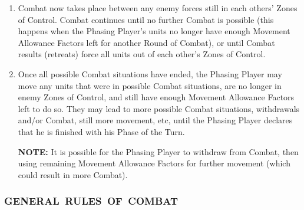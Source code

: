 \begin{enumerate}
  The Non-Phasing Player must make this decision for each of his units or Stacks of units that lies in an Enemy Zone of Control.

  \item Combat now takes place between any enemy forces still in each others' Zones of Control. Combat continues until no further Combat is possible (this happens when the Phasing Player's units no longer have enough Movement Allowance Factors left for another Round of Combat), or until Combat results (retreats) force all units out of each other's Zones of Control.

  \item Once all possible Combat situations have ended, the Phasing Player may move any units that were in possible Combat situations, are no longer in enemy Zones of Control, and still have enough Movement Allowance Factors left to do so. They may lead to more possible Combat situations, withdrawals and/or Combat, still more movement, etc, until the Phasing Player declares that he is finished with his Phase of the Turn.

  \textbf{NOTE:} It is possible for the Phasing Player to withdraw from Combat, then using remaining Movement Allowance Factors for further movement (which could result in more Combat).
\end{enumerate}

\subsubsection[GENERAL RULES OF COMBAT]{\mbox{GENERAL RULES OF COMBAT}}

